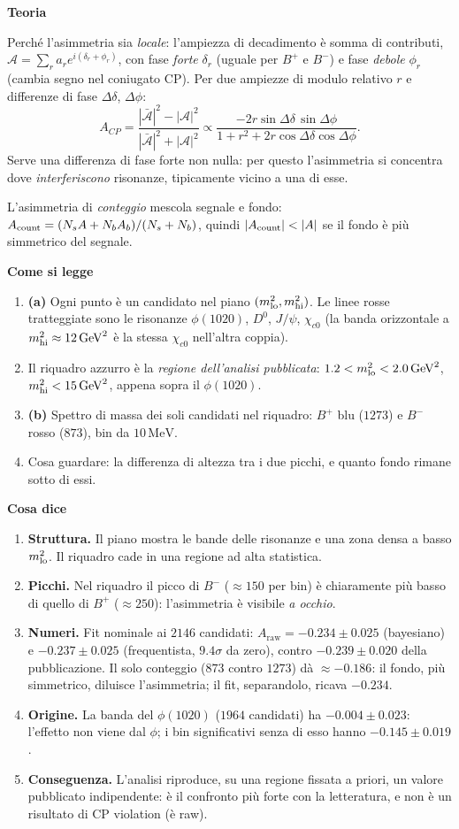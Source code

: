 \documentclass[10.5pt,a4paper]{article}
\newcommand{\Araw}{A_{\mathrm{raw}}}
\newcommand{\MeV}{\,\mathrm{MeV}}
\newcommand{\GeV}{\,\mathrm{GeV}}
\newcommand{\sez}[1]{\par\Needspace{6\baselineskip}\medskip\noindent\textbf{\large #1}\par\nopagebreak\smallskip}
\begin{document}
\sez{Teoria}
Perché l'asimmetria sia \emph{locale}: l'ampiezza di decadimento è somma di contributi, $\mathcal A=\sum_ra_re^{i(\delta_r+\phi_r)}$, con fase \emph{forte} $\delta_r$ (uguale per $B^+$ e $B^-$) e fase \emph{debole} $\phi_r$ (cambia segno nel coniugato CP). Per due ampiezze di modulo relativo $r$ e differenze di fase $\Delta\delta$, $\Delta\phi$:
\[
A_{CP}=\frac{|\bar{\mathcal A}|^2-|\mathcal A|^2}{|\bar{\mathcal A}|^2+|\mathcal A|^2}\propto \frac{-2r\sin\Delta\delta\,\sin\Delta\phi}{1+r^2+2r\cos\Delta\delta\cos\Delta\phi}.
\]
Serve una differenza di fase forte non nulla: per questo l'asimmetria si concentra dove \emph{interferiscono} risonanze, tipicamente vicino a una di esse.

L'asimmetria di \emph{conteggio} mescola segnale e fondo: $A_{\rm count}=(N_sA+N_bA_b)/(N_s+N_b)$, quindi $|A_{\rm count}|<|A|$ se il fondo è più simmetrico del segnale.

\sez{Come si legge}
\begin{enumerate}
\item \textbf{(a)} Ogni punto è un candidato nel piano $(m^2_{\rm lo},m^2_{\rm hi})$. Le linee rosse tratteggiate sono le risonanze $\phi(1020)$, $D^0$, $J/\psi$, $\chi_{c0}$ (la banda orizzontale a $m^2_{\rm hi}\approx12\GeV^2$ è la stessa $\chi_{c0}$ nell'altra coppia).
\item Il riquadro azzurro è la \emph{regione dell'analisi pubblicata}: $1.2<m^2_{\rm lo}<2.0\GeV^2$, $m^2_{\rm hi}<15\GeV^2$, appena sopra il $\phi(1020)$.
\item \textbf{(b)} Spettro di massa dei soli candidati nel riquadro: $B^+$ blu ($1273$) e $B^-$ rosso ($873$), bin da $10\MeV$.
\item Cosa guardare: la differenza di altezza tra i due picchi, e quanto fondo rimane sotto di essi.
\end{enumerate}

\sez{Cosa dice}
\begin{enumerate}
\item \textbf{Struttura.} Il piano mostra le bande delle risonanze e una zona densa a basso $m^2_{\rm lo}$. Il riquadro cade in una regione ad alta statistica.
\item \textbf{Picchi.} Nel riquadro il picco di $B^-$ ($\approx150$ per bin) è chiaramente più basso di quello di $B^+$ ($\approx250$): l'asimmetria è visibile \emph{a occhio}.
\item \textbf{Numeri.} Fit nominale ai $2146$ candidati: $\Araw=-0.234\pm0.025$ (bayesiano) e $-0.237\pm0.025$ (frequentista, $9.4\sigma$ da zero), contro $-0.239\pm0.020$ della pubblicazione. Il solo conteggio ($873$ contro $1273$) dà $\approx-0.186$: il fondo, più simmetrico, diluisce l'asimmetria; il fit, separandolo, ricava $-0.234$.
\item \textbf{Origine.} La banda del $\phi(1020)$ ($1964$ candidati) ha $-0.004\pm0.023$: l'effetto non viene dal $\phi$; i bin significativi senza di esso hanno $-0.145\pm0.019$.
\item \textbf{Conseguenza.} L'analisi riproduce, su una regione fissata a priori, un valore pubblicato indipendente: è il confronto più forte con la letteratura, e non è un risultato di CP violation (è raw).
\end{enumerate}
\end{document}
